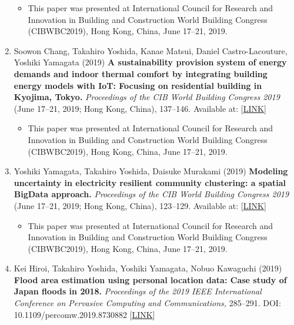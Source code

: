 \documentclass[
]{book}
\providecommand{\tightlist}{%
  \setlength{\itemsep}{0pt}\setlength{\parskip}{0pt}}
\begin{document}
\begin{enumerate}
  \begin{itemize}
  \tightlist
  \item
    This paper was presented at International Council for Research and Innovation in Building and Construction World Building Congress (CIBWBC2019), Hong Kong, China, June 17--21, 2019.
  \end{itemize}
\item
  Soowon Chang, Takahiro Yoshida, Kanae Matsui, Daniel Castro-Lacouture, Yoshiki Yamagata (2019)
  \textbf{A sustainability provision system of energy demands and indoor thermal comfort by integrating building energy models with IoT: Focusing on residential building in Kyojima, Tokyo.}
  \emph{Proceedings of the CIB World Building Congress 2019} (June 17--21, 2019; Hong Kong, China), 137--146.
  Available at: {[}\href{https://site.cibworld.nl/dl/publications/WBC19/WBC_Proceedings_June2019_Complete.pdf}{LINK}{]}

  \begin{itemize}
  \tightlist
  \item
    This paper was presented at International Council for Research and Innovation in Building and Construction World Building Congress (CIBWBC2019), Hong Kong, China, June 17--21, 2019.
  \end{itemize}
\item
  Yoshiki Yamagata, Takahiro Yoshida, Daisuke Murakami (2019)
  \textbf{Modeling uncertainty in electricity resilient community clustering: a spatial BigData approach.}
  \emph{Proceedings of the CIB World Building Congress 2019} (June 17--21, 2019; Hong Kong, China), 123--129.
  Available at: {[}\href{https://site.cibworld.nl/dl/publications/WBC19/WBC_Proceedings_June2019_Complete.pdf}{LINK}{]}

  \begin{itemize}
  \tightlist
  \item
    This paper was presented at International Council for Research and Innovation in Building and Construction World Building Congress (CIBWBC2019), Hong Kong, China, June 17--21, 2019.
  \end{itemize}
\item
  Kei Hiroi, Takahiro Yoshida, Yoshiki Yamagata, Nobuo Kawaguchi (2019)
  \textbf{Flood area estimation using personal location data: Case study of Japan floods in 2018.}
  \emph{Proceedings of the 2019 IEEE International Conference on Pervasive Computing and Communications,} 285--291.
  DOI: 10.1109/percomw.2019.8730882 {[}\href{https://ieeexplore.ieee.org/document/8730882}{LINK}{]}


\end{enumerate}
\end{document}
